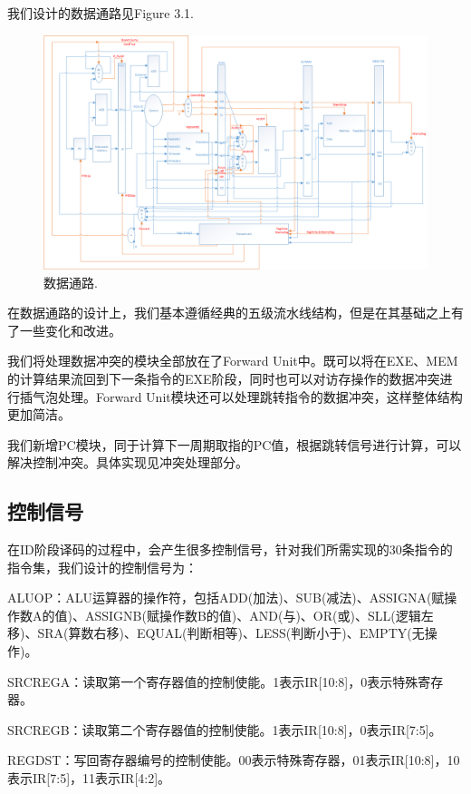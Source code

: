 我们设计的数据通路见Figure 3.1.
\begin{figure}[H]
  \includegraphics[width=\linewidth]{Figures/datapath.png}
  \caption{数据通路.}
\end{figure}

在数据通路的设计上，我们基本遵循经典的五级流水线结构，但是在其基础之上有了一些变化和改进。

我们将处理数据冲突的模块全部放在了Forward Unit中。既可以将在EXE、MEM的计算结果流回到下一条指令的EXE阶段，同时也可以对访存操作的数据冲突进行插气泡处理。Forward Unit模块还可以处理跳转指令的数据冲突，这样整体结构更加简洁。

我们新增PC模块，同于计算下一周期取指的PC值，根据跳转信号进行计算，可以解决控制冲突。具体实现见冲突处理部分。


\subsection{控制信号}
在ID阶段译码的过程中，会产生很多控制信号，针对我们所需实现的30条指令的指令集，我们设计的控制信号为：

ALUOP：ALU运算器的操作符，包括ADD(加法)、SUB(减法)、ASSIGNA(赋操作数A的值)、ASSIGNB(赋操作数B的值)、AND(与)、OR(或)、SLL(逻辑左移)、SRA(算数右移)、EQUAL(判断相等)、LESS(判断小于)、EMPTY(无操作)。

SRCREGA：读取第一个寄存器值的控制使能。1表示IR[10:8]，0表示特殊寄存器。

SRCREGB：读取第二个寄存器值的控制使能。1表示IR[10:8]，0表示IR[7:5]。

REGDST：写回寄存器编号的控制使能。00表示特殊寄存器，01表示IR[10:8]，10表示IR[7:5]，11表示IR[4:2]。

